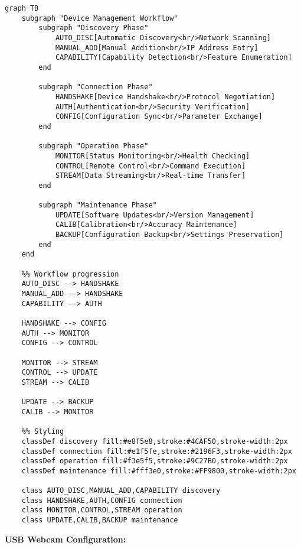 \documentclass[11pt,a4paper]{article}
\begin{document}
\begin{verbatim}
graph TB
    subgraph "Device Management Workflow"
        subgraph "Discovery Phase"
            AUTO_DISC[Automatic Discovery<br/>Network Scanning]
            MANUAL_ADD[Manual Addition<br/>IP Address Entry]
            CAPABILITY[Capability Detection<br/>Feature Enumeration]
        end

        subgraph "Connection Phase"
            HANDSHAKE[Device Handshake<br/>Protocol Negotiation]
            AUTH[Authentication<br/>Security Verification]
            CONFIG[Configuration Sync<br/>Parameter Exchange]
        end

        subgraph "Operation Phase"
            MONITOR[Status Monitoring<br/>Health Checking]
            CONTROL[Remote Control<br/>Command Execution]
            STREAM[Data Streaming<br/>Real-time Transfer]
        end

        subgraph "Maintenance Phase"
            UPDATE[Software Updates<br/>Version Management]
            CALIB[Calibration<br/>Accuracy Maintenance]
            BACKUP[Configuration Backup<br/>Settings Preservation]
        end
    end

    %% Workflow progression
    AUTO_DISC --> HANDSHAKE
    MANUAL_ADD --> HANDSHAKE
    CAPABILITY --> AUTH

    HANDSHAKE --> CONFIG
    AUTH --> MONITOR
    CONFIG --> CONTROL

    MONITOR --> STREAM
    CONTROL --> UPDATE
    STREAM --> CALIB

    UPDATE --> BACKUP
    CALIB --> MONITOR

    %% Styling
    classDef discovery fill:#e8f5e8,stroke:#4CAF50,stroke-width:2px
    classDef connection fill:#e1f5fe,stroke:#2196F3,stroke-width:2px
    classDef operation fill:#f3e5f5,stroke:#9C27B0,stroke-width:2px
    classDef maintenance fill:#fff3e0,stroke:#FF9800,stroke-width:2px

    class AUTO_DISC,MANUAL_ADD,CAPABILITY discovery
    class HANDSHAKE,AUTH,CONFIG connection
    class MONITOR,CONTROL,STREAM operation
    class UPDATE,CALIB,BACKUP maintenance
\end{verbatim}

\textbf{USB Webcam Configuration:}
\end{document}
